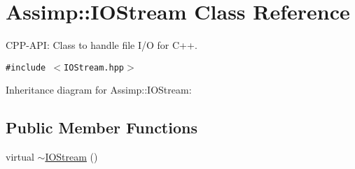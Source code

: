 \hypertarget{class_assimp_1_1_i_o_stream}{
\section{Assimp::IOStream Class Reference}
\label{class_assimp_1_1_i_o_stream}
}
CPP-API: Class to handle file I/O for C++.  


{\tt \#include $<$IOStream.hpp$>$}

Inheritance diagram for Assimp::IOStream:\subsection*{Public Member Functions}
\begin{CompactItemize}
\item 
\hypertarget{class_assimp_1_1_i_o_stream_6cedc5033bf531bf14b97d1c9b788de8}{
virtual \hyperlink{class_assimp_1_1_i_o_stream_6cedc5033bf531bf14b97d1c9b788de8}{$\sim$IOStream} ()}
\label{class_assimp_1_1_i_o_stream_6cedc5033bf531bf14b97d1c9b788de8}


\end{CompactItemize}
